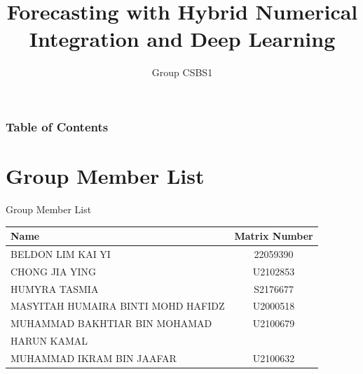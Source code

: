 \documentclass[10pt]{beamer}
\title[Forecasting Case Study]{Forecasting with Hybrid Numerical Integration and Deep Learning}
\subtitle{Group CSBS1}
\institute[WID3015 Numerical Analysis]{Supervisor: Dr. Suzan J. Obaiys}
\date[Universiti Malaya]
\begin{document}
\begin{frame}
    \titlepage
\end{frame}

\begin{frame}
    \frametitle{Table of Contents}
    \tableofcontents
\end{frame}

\section{Group Member List}
\begin{frame}{Group Member List}
    \begin{table}
    \begin{center}
    \small
        \begin{tabular}{|l|c|}
            \hline
            \textbf{Name} & \textbf{Matrix Number} \\ \hline
            BELDON LIM KAI YI  & 22059390  \\ \hline
            CHONG JIA YING  & U2102853  \\ \hline
            HUMYRA TASMIA  & S2176677  \\ \hline
            MASYITAH HUMAIRA BINTI MOHD HAFIDZ  & U2000518  \\ \hline
            MUHAMMAD BAKHTIAR BIN MOHAMAD  & U2100679 \\
            HARUN KAMAL  &  \\ \hline
            MUHAMMAD IKRAM BIN JAAFAR  & U2100632  \\ \hline
        \end{tabular}
    \end{center}
    \end{table}
\end{frame}

\end{document}
